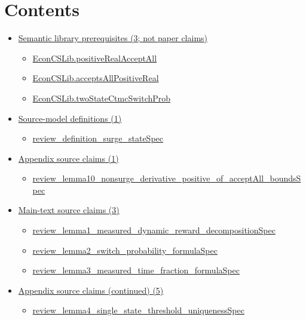 \documentclass[10pt]{article}
\begin{document}
\section*{Contents}
\begin{itemize}[leftmargin=1.2em]
\item \hyperlink{library-section-9ed08282feb75b10}{Semantic library prerequisites (3; not paper claims)}
\begin{itemize}[leftmargin=1.2em]
\item \hyperlink{library-prerequisite-7716ce13bd12468c}{EconCSLib.positiveRealAcceptAll}
\item \hyperlink{library-prerequisite-091d3e21c8ffcbb9}{EconCSLib.acceptsAllPositiveReal}
\item \hyperlink{library-prerequisite-e74ecbac6eb005a3}{EconCSLib.twoStateCtmcSwitchProb}
\end{itemize}
\item \hyperlink{source-section-18edf361830b9d0b}{Source-model definitions (1)}
\begin{itemize}[leftmargin=1.2em]
\item \hyperlink{source-claim-8cb807f3cc8978b3}{review\_definition\_surge\_stateSpec}
\end{itemize}
\item \hyperlink{source-section-fc0f8ef37eccf87b}{Appendix source claims (1)}
\begin{itemize}[leftmargin=1.2em]
\item \hyperlink{source-claim-7650473d990d95c0}{review\_lemma10\_nonsurge\_derivative\_positive\_of\_acceptAll\_boundsSpec}
\end{itemize}
\item \hyperlink{source-section-0c7af8265958a9ea}{Main-text source claims (3)}
\begin{itemize}[leftmargin=1.2em]
\item \hyperlink{source-claim-0847fd2171fe1fa6}{review\_lemma1\_measured\_dynamic\_reward\_decompositionSpec}
\item \hyperlink{source-claim-dbe4c990fc185239}{review\_lemma2\_switch\_probability\_formulaSpec}
\item \hyperlink{source-claim-ebc105656e6d5688}{review\_lemma3\_measured\_time\_fraction\_formulaSpec}
\end{itemize}
\item \hyperlink{source-section-2ccaa156c5fe17ad}{Appendix source claims (continued) (5)}
\begin{itemize}[leftmargin=1.2em]
\item \hyperlink{source-claim-62d2ac601494c757}{review\_lemma4\_single\_state\_threshold\_uniquenessSpec}

\end{itemize}
\end{itemize}
\end{document}
